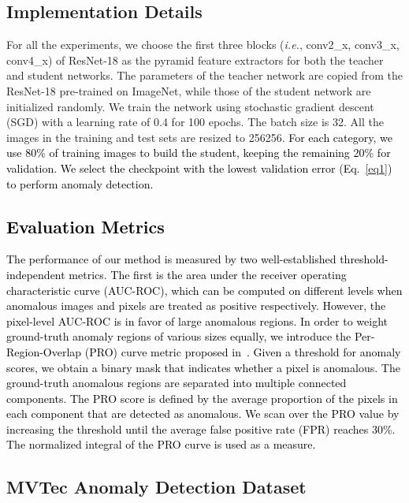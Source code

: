 \documentclass{bmvc2k}
\newcommand{\wgd}[1]{\textcolor{black}{{}#1}}
\begin{document}
\subsection{Implementation Details}

For all the experiments, we choose the first three blocks (\textit{i.e.}, conv2\_x, conv3\_x, conv4\_x) of ResNet-18 as the pyramid feature extractors for both the teacher and student networks. The parameters of the teacher network are copied from the ResNet-18 pre-trained on ImageNet, while those of the student network are initialized randomly. We train the network using stochastic gradient descent (SGD) with a learning rate of 0.4 for 100 epochs. The batch size is 32. All the images in the training and test sets are resized to 256256. \wgd{For each category, we use 80\% of training images to build the student, keeping the remaining 20\% for validation. We select the checkpoint with the lowest validation error (Eq.~\ref{eq1}) to perform anomaly detection.}


\iffalse
\wgd{\subsection{Evaluation Metrics} The performance of our method is measured by two well-established threshold-independent metrics. The first is the area under the receiver operating characteristic curve (AUC-ROC), which can be computed on different levels when anomalous images and pixels are treated as positive respectively. However, the pixel-level AUC-ROC is in favor of large anomalous regions. In order to weight ground-truth anomaly regions of various sizes equally, we introduce the Per-Region-Overlap (PRO) curve metric proposed in~\cite{Bergmann2020}. Given a threshold for anomaly scores, we obtain a binary mask that indicates whether a pixel is anomalous. The ground-truth anomalous regions are separated into multiple connected components. The PRO score is defined by the average proportion of the pixels in each component that are detected as anomalous. We scan over the PRO value by increasing the threshold until the average false positive rate (FPR) reaches 30\%. The normalized integral of the PRO curve is used as a measure.}





\subsection{MVTec Anomaly Detection Dataset}
\label{sec4-sub2}
\end{document}
